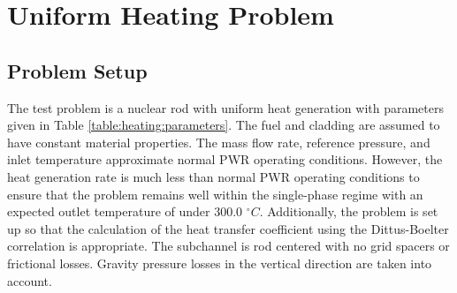 \vspace*{-80mm}
\chapter{Uniform Heating Problem} \label{chapter7:uniform_heating}
 
\section{Problem Setup}


The test problem is a nuclear rod with uniform heat generation with parameters
given in Table \ref{table:heating:parameters}. The fuel and cladding are assumed
to have constant material properties. The mass flow rate, reference pressure, and inlet
temperature approximate normal PWR operating conditions. However, the heat
generation rate is much less than normal PWR operating conditions to ensure that
the problem remains well  within the single-phase regime with an expected outlet
temperature of under 300.0 $^{\circ}C$. Additionally, the problem is set
up so that the calculation of the heat transfer coefficient using the Dittus-Boelter
correlation is appropriate. The subchannel is rod centered with no grid spacers
or frictional losses. Gravity pressure losses in the vertical direction are
taken into account. 

